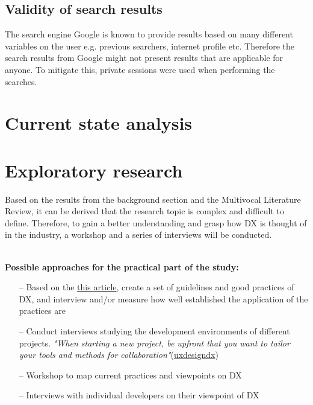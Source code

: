 \documentclass[english, 12pt, a4paper, sci, utf8, a-1b, online]{aaltothesis}
\begin{document}
\subsection{Validity of search results}

The search engine Google is known to provide results based on many different variables on the user e.g. previous searchers, internet profile etc. Therefore the search results from Google might not present results that are applicable for anyone. To mitigate this, private sessions were used when performing the searches.

\clearpage
\section{Current state analysis}


\clearpage
\section{Exploratory research}

Based on the results from the background section and the Multivocal Literature Review, it can be derived that the research topic is complex and difficult to define. Therefore, to gain a better understanding and grasp how DX is thought of in the industry, a workshop and a series of interviews will be conducted.

\textbf{\\ Possible approaches for the practical part of the study:}

\newcommand{\uxdesigndx}{https://uxdesign.cc/contributing-great-developer-experience-designer-e1f497b0fb4}

\begin{itemize}
  \item [--] Based on the \href{\uxdesigndx}{this article}, create a set of guidelines and good practices of DX, and interview and/or measure how well established the application of the practices are
  \item [--] Conduct interviews studying the development environments of different projects. \textit{"When starting a new project, be upfront that you want to tailor your tools and methods for collaboration"}(\href{\uxdesigndx}{uxdesigndx})
  \item [--] Workshop to map current practices and viewpoints on DX
  \item [--] Interviews with individual developers on their viewpoint of DX
\end{itemize}
\end{document}
